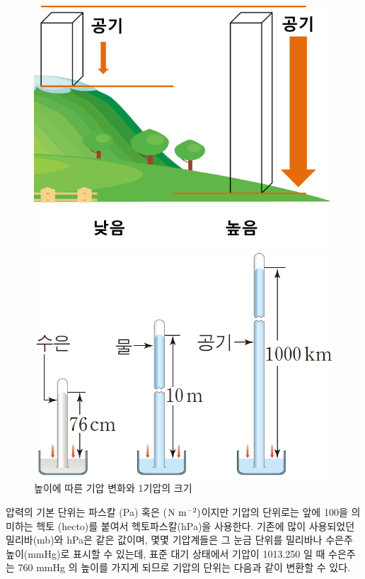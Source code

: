 \begin{itemize}
{\begin{figure}[h]
	\centering
	\begin{minipage}{.45\textwidth}
	\centering	
	\includegraphics[width=0.95\linewidth]{21observing/images/airPressuire}
	\end{minipage}
	\begin{minipage}{.45\textwidth}
	\centering
	\includegraphics[width=0.95\linewidth]{21observing/images/4_14_a_7}
	\end{minipage}
	\caption{높이에 따른 기압 변화와 1기압의 크기}
	\label{fig:414a7}
\end{figure}

압력의 기본 단위는 파스칼 (Pa) 혹은 ($\rm {N~m^{-2}})$이지만 기압의 단위로는 앞에 100을 의미하는 헥토 (hecto)를 붙여서 헥토파스칼(hPa)을 사용한다. 기존에 많이 사용되었던 밀리바(mb)와 hPa은 같은 값이며, 몇몇 기압계들은 그 눈금 단위를 밀리바나 수은주 높이(mmHg)로 표시할 수 있는데, 표준 대기 상태에서 기압이 1013.250 일 때 수은주는 760 mmHg 의 높이를 가지게 되므로 기압의 단위는 다음과 같이 변환할 수 있다.
	
}
\end{itemize}
